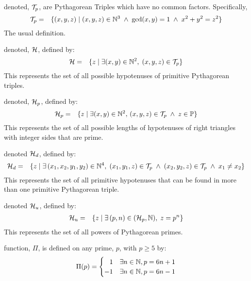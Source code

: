 \documentclass{article}
\theoremstyle{definition}
\begin{document}
 denoted, ${\cal T}_p$, are Pythagorean Triples which have no common factors. Specifically,
\begin{eqnarray}
  {\cal T}_p & = & \{ (x,y,z) \; | \; (x,y,z) \in \mathbb{N}^3 \; \wedge \; \gcd(x,y) = 1 \; \wedge \; x^2 + y^2 = z^2 \}
\end{eqnarray}
The usual definition.

 denoted, ${\cal H}$, defined by:
\begin{eqnarray}
  {\cal H} & = & \{ z \; | \; \exists (x,y) \in \mathbb{N}^2, \;  (x,y,z) \in {\cal T}_p \}
\end{eqnarray}
This represents the set of all possible hypotenuses of primitive Pythagorean triples.

 denoted, ${\cal H}_p$, defined by:
\begin{eqnarray}
  {\cal H}_p & = & \{ z \; | \; \exists (x,y) \in \mathbb{N}^2, \, (x,y,z) \in {\cal T}_p \; \wedge \; z \in \mathbb{P} \}
\end{eqnarray}
This represents the set of all possible lengths of hypotenuses of right triangles with integer sides that are prime.

 denoted ${\cal H}_d$, defined by:
\begin{eqnarray}
  {\cal H}_{d} & = & \{ z \; | \; \exists\, (x_1, x_2, y_1, y_2) \in \mathbb{N}^4, \; 
      (x_1,y_1,z) \in {\cal T}_p \; \wedge \; (x_2, y_2, z) \in {\cal T}_p \; \wedge \; x_1 \neq x_2 \}  
\end{eqnarray}
This represents the set of all primitive hypotenuses that can be found in more than one primitive Pythagorean triple.

 denoted ${\cal H}_u$, defined by:
\begin{eqnarray}
  {\cal H}_u & = & \{ z \; | \; \exists\,(p,n) \in ({\cal H}_p, \mathbb{N}), \; z = p^n \}
\end{eqnarray}
This represents the set of all powers of Pythagorean primes.


 function, $\Pi$, is defined on any prime, $p$, with $p \ge 5$ by:
\begin{eqnarray}
  \Pi(p) = \begin{cases}
  \hphantom{-}1\hfil & \exists n \in \mathbb{N}, p = 6n + 1 \\
            -1 \hfil & \exists n \in \mathbb{N}, p = 6n - 1 \\
             \end{cases} 
\end{eqnarray}
\end{document}
